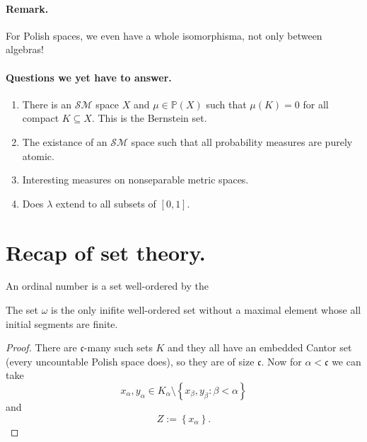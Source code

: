 \paragraph{Remark.} For Polish spaces, we even have a whole isomorphisma, not only between algebras!

\paragraph{Questions we yet have to answer.} 
\begin{enumerate}
    \item There is an \( \mathcal{SM} \) space \( X \) and \( \mu \in \mathbb{P}(X) \) such that \( \mu(K) = 0 \) for all compact \( K \subseteq X \). This is the Bernstein set.
    \item The existance of an \( \mathcal{SM} \) space such that all probability measures are purely atomic.
    \item Interesting measures on nonseparable metric spaces.
    \item Does \(\lambda \) extend to all subsets of \( [0,1] \).
\end{enumerate}

\section{Recap of set theory.} An ordinal number is a set well-ordered by the 


The set \( \omega \) is the only inifite well-ordered set without a maximal element whose all initial segments are finite.

\begin{proof}
There are \( \mathfrak{c} \)-many such sets \( K \) and they all have an embedded Cantor set (every uncountable Polish space does), so they are of size \( \mathfrak{c} \). Now for \( \alpha < \mathfrak{c} \) we can take
\[ 
    x_\alpha, y_\alpha \in K_\alpha \setminus \left\{ x_\beta, y_\beta : \beta < \alpha  \right\} 
\]
and
\[ 
     Z := \left\{ x_\alpha \right\}.
\]
\end{proof}


